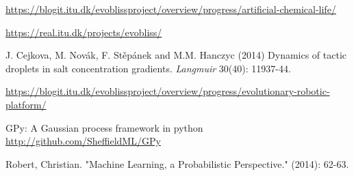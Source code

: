 \documentclass[a4paper]{article}
\begin{document}
\begin{thebibliography}{9}
	
	\url{https://blogit.itu.dk/evoblissproject/overview/progress/artificial-chemical-life/}
	
	\url{https://real.itu.dk/projects/evobliss/}	

	J. Cejkova, M. Novák, F. Stěpánek and M.M. Hanczyc (2014) Dynamics of tactic droplets in salt concentration gradients. \textit{Langmuir} 30(40): 11937-44.

	\url{https://blogit.itu.dk/evoblissproject/overview/progress/evolutionary-robotic-platform/}

	GPy: A Gaussian process framework in python
	\url{http://github.com/SheffieldML/GPy}

Robert, Christian. "Machine Learning, a Probabilistic Perspective." (2014): 62-63.


\end{thebibliography}
\end{document}
